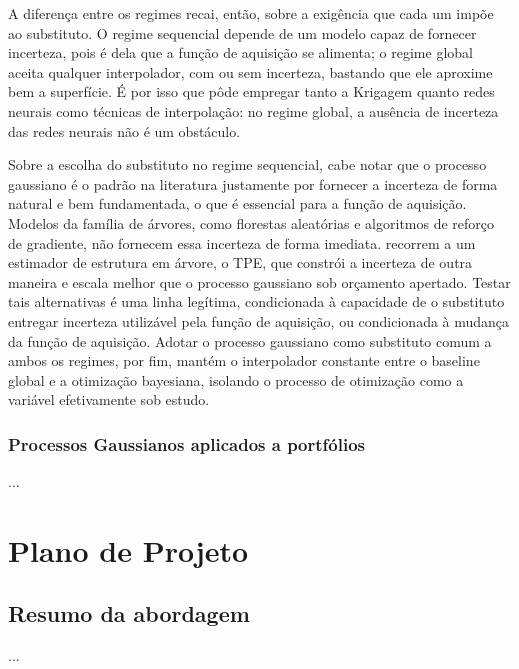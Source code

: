 \documentclass[12pt,a4paper]{article}
\begin{document}
A diferença entre os regimes recai, então, sobre a exigência que cada um impõe ao substituto. O regime sequencial depende de um modelo capaz de fornecer incerteza, pois é dela que a função de aquisição se alimenta; o regime global aceita qualquer interpolador, com ou sem incerteza, bastando que ele aproxime bem a superfície. É por isso que  pôde empregar tanto a Krigagem quanto redes neurais como técnicas de interpolação: no regime global, a ausência de incerteza das redes neurais não é um obstáculo.

Sobre a escolha do substituto no regime sequencial, cabe notar que o processo gaussiano é o padrão na literatura justamente por fornecer a incerteza de forma natural e bem fundamentada, o que é essencial para a função de aquisição. Modelos da família de árvores, como florestas aleatórias e algoritmos de reforço de gradiente, não fornecem essa incerteza de forma imediata.  recorrem a um estimador de estrutura em árvore, o TPE, que constrói a incerteza de outra maneira e escala melhor que o processo gaussiano sob orçamento apertado. Testar tais alternativas é uma linha legítima, condicionada à capacidade de o substituto entregar incerteza utilizável pela função de aquisição, ou condicionada à mudança da função de aquisição. Adotar o processo gaussiano como substituto comum a ambos os regimes, por fim, mantém o interpolador constante entre o baseline global e a otimização bayesiana, isolando o processo de otimização como a variável efetivamente sob estudo.


\subsubsection{Processos Gaussianos aplicados a portfólios}

...

\section{Plano de Projeto}
\label{sec:plano}

\subsection{Resumo da abordagem}

...
\end{document}
